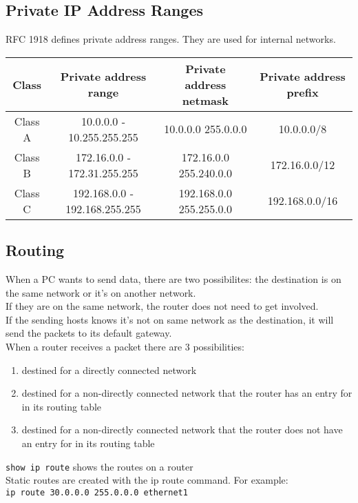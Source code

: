 \subsection{Private IP Address Ranges}

RFC 1918 defines private address ranges. They are used for internal networks.\\

\begin{tabular}{ | c | c | c | c | }
\hline
Class & Private address range & Private address netmask & Private address prefix \\ \hline
Class A & 10.0.0.0 - 10.255.255.255 & 10.0.0.0 255.0.0.0 & 10.0.0.0/8 \\ \hline
Class B & 172.16.0.0 - 172.31.255.255 & 172.16.0.0 255.240.0.0 & 172.16.0.0/12 \\ \hline
Class C & 192.168.0.0 - 192.168.255.255 & 192.168.0.0 255.255.0.0 & 192.168.0.0/16 \\ \hline
\end{tabular}

\subsection{Routing}

When a PC wants to send data, there are two possibilites: the destination
is on the same network or it's on another network.\\

If they are on the same network, the router does not need to get involved.\\

If the sending hosts knows it's not on same network as the destination, it will
send the packets to its default gateway.\\

When a router receives a packet there are 3 possibilities:

\begin{enumerate}

\item destined for a directly connected network
\item destined for a non-directly connected network that the router has an
entry for in its routing table
\item destined for a non-directly connected network that the router does not
have an entry for in its routing table

\end{enumerate}

\texttt{show ip route} shows the routes on a router\\

Static routes are created with the ip route command. For example:\\

\texttt{ip route 30.0.0.0 255.0.0.0 ethernet1}\\

